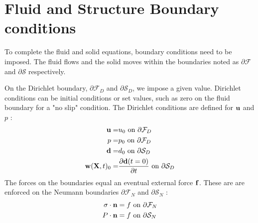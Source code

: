 \section{Fluid and Structure Boundary conditions}
To complete the fluid and solid equations, boundary conditions need to be imposed. The fluid flows and the solid moves within the boundaries noted as $ \partial\mathcal{F}$ and $ \partial \mathcal{S}$ respectively. 

On the Dirichlet boundary, $ \partial \mathcal{F}_D$ and $ \partial \mathcal{S}_D$, we impose a given value. Dirichlet conditions can be initial conditions or set values, such as zero on the fluid boundary for a "no slip" condition. The Dirichlet conditions are defined for $\bold{u}$ and $p$ :
\begin{align}
\bold{u} =& u_0 \text{   on   } \partial \mathcal{F}_D  \\
p =& p_0 \text{   on   } \partial \mathcal{F}_D  \\
\bold{d} =& d_0 \text{ on   } \partial \mathcal{S}_D  \\
\bold{w}(\textbf{X},t)_0 =& \frac{\partial \bold{d}(t=0)}{\partial t} \text{   on   } \partial \mathcal{S}_D   
\end{align}
The forces on the boundaries equal an eventual external force $ \bold{f}$. These are are enforced on the Neumann boundaries $\partial \mathcal{F}_N$ and  $\partial \mathcal{S}_N$ :
\begin{align}
\sigma \cdot \bold{n} &= f \text{   on   } \partial \mathcal{F}_N \\   
P\cdot \bold{n} &= f \text{   on   } \partial \mathcal{S}_N    
\end{align}
